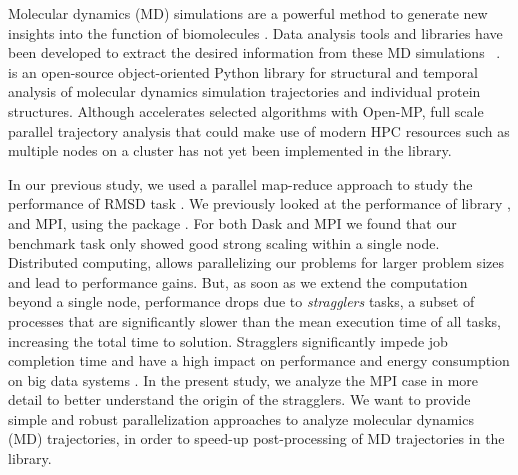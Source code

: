 \label{sec:introduction}
Molecular dynamics (MD) simulations are a powerful method to generate new insights into the function of biomolecules \citep{Borhani:2012mi, Dror:2012cr, Orozco:2014dq, Perilla:2015kx, Bottaro:2018aa}.
Data analysis tools and libraries have been developed to extract the desired information from these MD simulations ~\cite{nmoldyn, nmoldyn-2012, Hum96, Hinsen:2000kx, Grant:2006ud, himach-2008, Romo:2009zr, Romo:2014bh, Michaud-Agrawal:2011fu, Gowers:2016aa, cpptraj-2013, mdtraj-2015, pteros2015, Doerr:2016aa}. 
 \citep{Gowers:2016aa,Michaud-Agrawal:2011fu} is an open-source object-oriented Python library for structural and temporal analysis of molecular dynamics simulation trajectories and individual protein structures.
Although  accelerates selected algorithms with Open-MP, full scale parallel trajectory analysis that could make use of modern HPC resources such as multiple nodes on a cluster has not yet been implemented in the library.

In our previous study, we used a parallel map-reduce approach to study the performance of RMSD task \cite{Khoshlessan:2017ab, ICCP-2018}. 
We previously looked at the performance of  library \cite{Rocklin:2015aa}, and MPI, using the  package \cite{Dalcin:2011aa, Dalcin:2005aa}. 
For both Dask and MPI we found that our benchmark task only showed good strong scaling within a single node.
Distributed computing, allows parallelizing our problems for larger problem sizes and lead to performance gains.
But, as soon as we extend the computation beyond a single node, performance drops due to \emph{stragglers} tasks, a subset of processes that are significantly slower than the mean execution time of all tasks, increasing the total time to solution.
Stragglers significantly impede job completion time \cite{Garraghan2016} and have a high impact on performance and energy consumption on big data systems \cite{Tien-2017}.
In the present study, we analyze the MPI case in more detail to better understand the origin of the stragglers.
We want to provide simple and robust parallelization approaches to analyze molecular dynamics (MD) trajectories, in order to speed-up post-processing of MD trajectories in the  library. 

